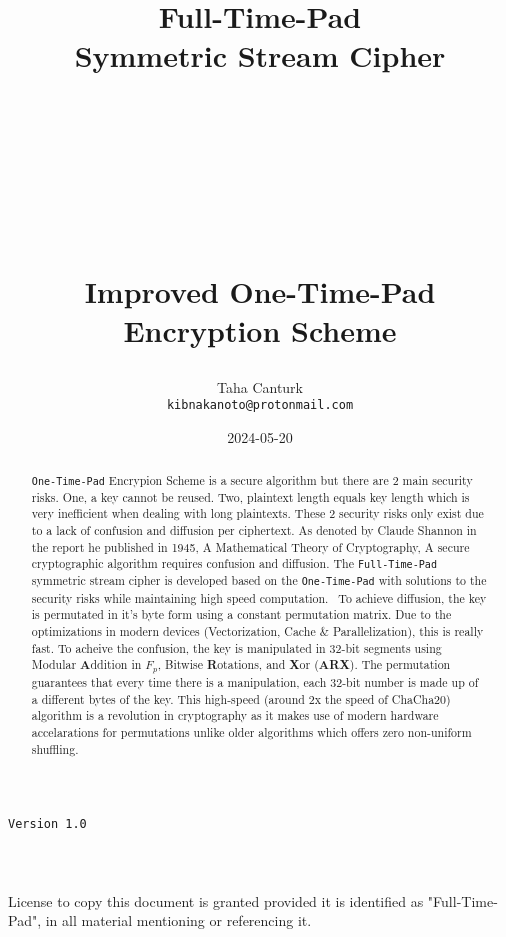 \documentclass[fleqn, a4paper,12pt]{article}
\title {
	\Huge \textbf{Full-Time-Pad\\Symmetric Stream Cipher} \\
	\ \\
	\ \\
	\ \\
	\ \\
	\ \\
	\Large \textbf{Improved One-Time-Pad Encryption Scheme}

}
\author{Taha Canturk\\\texttt{kibnakanoto@protonmail.com}}
\date{2024-05-20}
\begin{document}
\maketitle
\thispagestyle{empty}


\begin{center}
		\Large \texttt{Version 1.0}
		\ \\
		\ \\
		\ \\
		\ \\
		\small License to copy this document is granted provided it is identified as "Full-Time-Pad", in all material mentioning or referencing it.
\end{center}

\newpage


\begin{abstract}
		\fontsize{12}{18}\selectfont \texttt{One-Time-Pad} Encrypion Scheme is a secure algorithm but there are 2 main security risks. One, a key cannot be reused. Two, plaintext length equals key length which is very inefficient when dealing with long plaintexts. These 2 security risks only exist due to a lack of confusion and diffusion per ciphertext. As denoted by Claude Shannon in the report he published in 1945, A Mathematical Theory of Cryptography, A secure cryptographic algorithm requires confusion and diffusion. The \texttt{Full-Time-Pad} symmetric stream cipher is developed based on the \texttt{One-Time-Pad} with solutions to the security risks while maintaining high speed computation. \
		To achieve diffusion, the key is permutated in it's byte form using a constant permutation matrix. Due to the optimizations in modern devices (Vectorization, Cache \& Parallelization), this is really fast. To acheive the confusion, the key is manipulated in 32-bit segments using Modular \textbf{A}ddition in $F_p$, Bitwise \textbf{R}otations, and \textbf{X}or (\textbf{ARX}). The permutation guarantees that every time there is a manipulation, each 32-bit number is made up of a different bytes of the key. This high-speed (around 2x the speed of ChaCha20) algorithm is a revolution in cryptography as it makes use of modern hardware accelarations for permutations unlike older algorithms which offers zero non-uniform shuffling.

\end{abstract}

\newpage

\tableofcontents

\newpage
\end{document}
